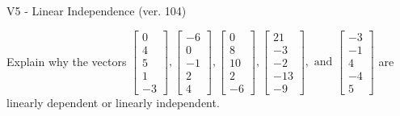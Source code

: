 \begin{exercise}
  \begin{exerciseTitle}V5 - Linear Independence (ver. 104)\end{exerciseTitle}
  \begin{exerciseStatement}
    Explain why the vectors \(\left[\begin{array}{r}
0 \\
4 \\
5 \\
1 \\
-3
\end{array}\right] , \left[\begin{array}{r}
-6 \\
0 \\
-1 \\
2 \\
4
\end{array}\right] , \left[\begin{array}{r}
0 \\
8 \\
10 \\
2 \\
-6
\end{array}\right] , \left[\begin{array}{r}
21 \\
-3 \\
-2 \\
-13 \\
-9
\end{array}\right] , \text{ and } \left[\begin{array}{r}
-3 \\
-1 \\
4 \\
-4 \\
5
\end{array}\right]\) are linearly dependent or linearly independent.	



\end{exerciseStatement}
\end{exercise}
